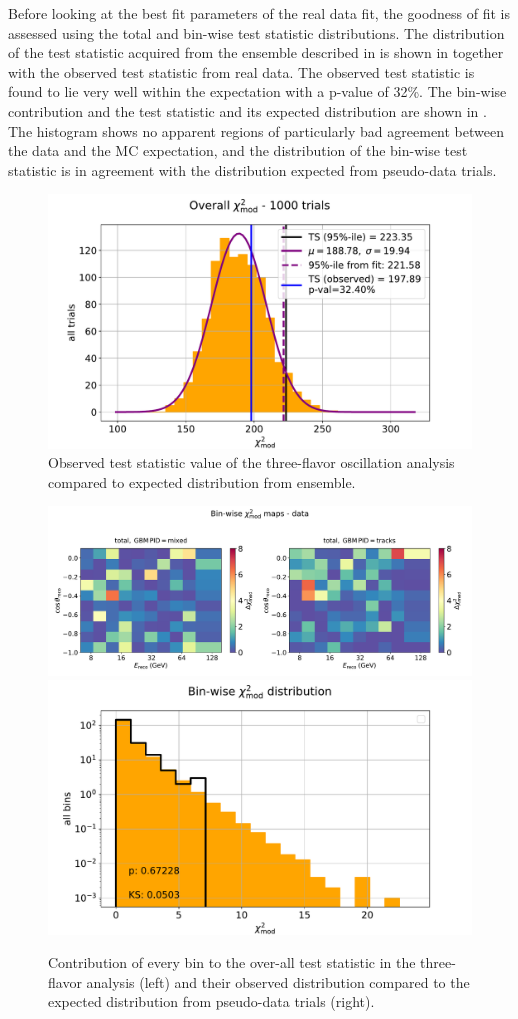 Before looking at the best fit parameters of the real data fit, the goodness of fit is assessed using the total and bin-wise test statistic distributions.
The distribution of the test statistic acquired from the ensemble described in  is shown in  together with the observed test statistic from real data.
The observed test statistic is found to lie very well within the expectation with a p-value of 32\%.
The bin-wise contribution and the test statistic and its expected distribution are shown in .
The histogram shows no apparent regions of particularly bad agreement between the data and the MC expectation, and the distribution of the bin-wise test statistic is in agreement with the distribution expected from pseudo-data trials.

\begin{figure}
    \centering
    \includegraphics[width=0.8\linewidth]{figures/measurement/three_flavor/ensemble_pre_fit/overall_ts_wings_trials.pdf}
    \caption{Observed test statistic value of the three-flavor oscillation analysis compared to expected distribution from ensemble.}
    \label{fig:three-flavor-ts-ensemble}
\end{figure}

\begin{figure}
    \centering
    \includegraphics[height=0.22\linewidth,trim={0 0 0 1.5cm},clip]{figures/measurement/three_flavor/ensemble_pre_fit/real_fit_binwise_pulls_pre_bugfix.pdf}
    \includegraphics[height=0.22\linewidth]{figures/measurement/three_flavor/ensemble_pre_fit/binwise_ts_wings_trials.pdf}
    \caption{Contribution of every bin to the over-all test statistic in the three-flavor analysis (left) and their observed distribution compared to the expected distribution from pseudo-data trials (right).}
    \label{fig:three-flavor-binwise-ts}
\end{figure}

